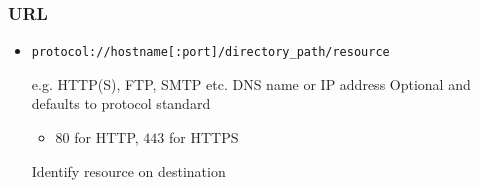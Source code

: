 \subsubsection{URL}
\begin{itemize}
     address to a internet source
    \item \verb+protocol://hostname[:port]/directory_path/resource+
        \begin{itemize}
             e.g. HTTP(S), FTP, SMTP etc.
             DNS name or IP address
             Optional and defaults to protocol standard
                \begin{itemize}
                    \item $80$ for HTTP, $443$ for HTTPS
                \end{itemize}
                 Identify resource on destination
        \end{itemize}
\end{itemize}


